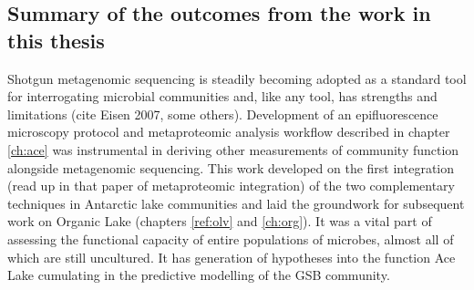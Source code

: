 
 



\subsection{Summary of the outcomes from the work in this thesis}
Shotgun metagenomic sequencing is steadily becoming adopted as a standard tool for interrogating microbial communities and, like any tool, has strengths and limitations (cite Eisen 2007, some others).
Development of an epifluorescence microscopy protocol and metaproteomic analysis workflow described in chapter \ref{ch:ace} was instrumental in deriving other measurements of community function alongside metagenomic sequencing.
This work developed on the first integration (read up in that paper of metaproteomic integration) of the two complementary techniques in Antarctic lake communities and laid the groundwork for subsequent work on Organic Lake (chapters \ref{ref:olv} and \ref{ch:org}).
It was a vital part of assessing the functional capacity of entire populations of microbes, almost all of which are still uncultured.
It has generation of hypotheses into the function Ace Lake cumulating in the predictive modelling of the \ac{GSB} community.

